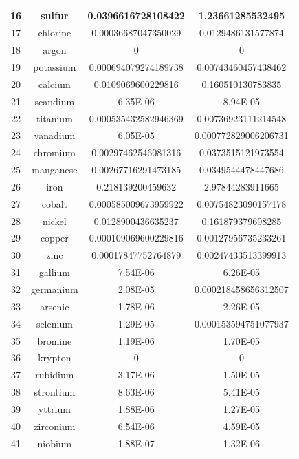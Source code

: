 \documentclass[a4paper]{article}
\begin{document}
\begin{center}
\begin{tabular}{|c|c|c|c|}
			\hline
			16 & sulfur & 0.0396616728108422 & 1.23661285532495 \\
			\hline
			17 & chlorine & 0.00036687047350029 & 0.0129486131577874 \\
			\hline
			18 & argon & 0 & 0 \\
			\hline
			19 & potassium & 0.000694079274189738 & 0.00743460457438462 \\
			\hline
			20 & calcium & 0.0109069600229816 & 0.160510130783835 \\
			\hline
			21 & scandium & 6.35E-06 & 8.94E-05 \\
			\hline
			22 & titanium & 0.000535432582946369 & 0.00736923111214548 \\
			\hline
			23 & vanadium & 6.05E-05 & 0.000772829006206731 \\
			\hline
			24 & chromium & 0.00297462546081316 & 0.0373515121973554 \\
			\hline
			25 & manganese & 0.00267716291473185 & 0.0349544478447686 \\
			\hline
			26 & iron & 0.218139200459632 & 2.97844283911665 \\
			\hline
			27 & cobalt & 0.000585009673959922 & 0.00754823090157178 \\
			\hline
			28 & nickel & 0.0128900436635237 & 0.161879379698285 \\
			\hline
			29 & copper & 0.000109069600229816 & 0.00127956735233261 \\
			\hline
			30 & zinc & 0.00017847752764879 & 0.00247433513399913 \\
			\hline
			31 & gallium & 7.54E-06 & 6.26E-05 \\
			\hline
			32 & germanium & 2.08E-05 & 0.000218458656312507 \\
			\hline
			33 & arsenic & 1.78E-06 & 2.26E-05 \\
			\hline
			34 & selenium & 1.29E-05 & 0.000153594751077937 \\
			\hline
			35 & bromine & 1.19E-06 & 1.70E-05 \\
			\hline
			36 & krypton & 0 & 0 \\
			\hline
			37 & rubidium & 3.17E-06 & 1.50E-05 \\
			\hline
			38 & strontium & 8.63E-06 & 5.41E-05 \\
			\hline
			39 & yttrium & 1.88E-06 & 1.27E-05 \\
			\hline
			40 & zirconium & 6.54E-06 & 4.59E-05 \\
			\hline
			41 & niobium & 1.88E-07 & 1.32E-06 \\

\end{tabular}
\end{center}
\end{document}
